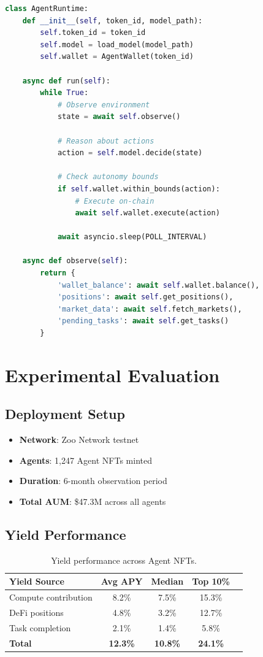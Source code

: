 \documentclass[11pt,letterpaper]{article}
\begin{document}
\begin{lstlisting}[language=python,caption=Agent Runtime]
class AgentRuntime:
    def __init__(self, token_id, model_path):
        self.token_id = token_id
        self.model = load_model(model_path)
        self.wallet = AgentWallet(token_id)

    async def run(self):
        while True:
            # Observe environment
            state = await self.observe()

            # Reason about actions
            action = self.model.decide(state)

            # Check autonomy bounds
            if self.wallet.within_bounds(action):
                # Execute on-chain
                await self.wallet.execute(action)

            await asyncio.sleep(POLL_INTERVAL)

    async def observe(self):
        return {
            'wallet_balance': await self.wallet.balance(),
            'positions': await self.get_positions(),
            'market_data': await self.fetch_markets(),
            'pending_tasks': await self.get_tasks()
        }
\end{lstlisting}

\section{Experimental Evaluation}
\label{sec:evaluation}

\subsection{Deployment Setup}

\begin{itemize}
    \item \textbf{Network}: Zoo Network testnet
    \item \textbf{Agents}: 1,247 Agent NFTs minted
    \item \textbf{Duration}: 6-month observation period
    \item \textbf{Total AUM}: \$47.3M across all agents
\end{itemize}

\subsection{Yield Performance}

\begin{table}[t]
\centering
\begin{tabular}{lcccc}
\toprule
\textbf{Yield Source} & \textbf{Avg APY} & \textbf{Median} & \textbf{Top 10\%} \\
\midrule
Compute contribution & 8.2\% & 7.5\% & 15.3\% \\
DeFi positions & 4.8\% & 3.2\% & 12.7\% \\
Task completion & 2.1\% & 1.4\% & 5.8\% \\
\midrule
\textbf{Total} & \textbf{12.3\%} & \textbf{10.8\%} & \textbf{24.1\%} \\
\bottomrule
\end{tabular}
\caption{Yield performance across Agent NFTs.}
\label{tab:yield}
\end{table}
\end{document}
